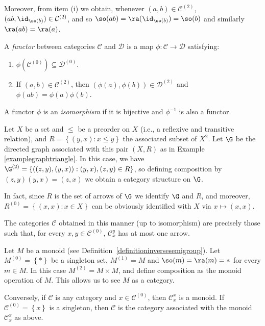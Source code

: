 Moreover, from item (i) we obtain, whenever $(a,b)\in\mathcal{C}^{(2)}$, $(ab,\id_{\so(b)})\in\mathcal{C}^{(2)}$, and so $\so(ab)=\ra(\id_{\so(b)})=\so(b)$ and similarly $\ra(ab)=\ra(a)$.

\begin{definition}
A \emph{functor} between categories $\mathcal{C}$ and $\mathcal{D}$ is a map $\phi:\mathcal{C}\to\mathcal{D}$ satisfying:
\begin{enumerate}
\item[(i)] $\phi(\mathcal{C}^{(0)})\subseteq\mathcal{D}^{(0)}$.
\item[(ii)] If $(a,b)\in\mathcal{C}^{(2)}$, then $(\phi(a),\phi(b))\in\mathcal{D}^{(2)}$ and $\phi(ab)=\phi(a)\phi(b)$.
\end{enumerate}
A functor $\phi$ is an \emph{isomorphism} if it is bijective and $\phi^{-1}$ is also a functor.
\end{definition}

\begin{example}\label{examplepreordersarecategories}
Let $X$ be a set and $\leq$ be a preorder on $X$ (i.e., a reflexive and transitive relation), and $R=\left\{(y,x):x\leq y\right\}$ the associated subset of $X^2$. Let $\G$ be the directed graph associated with this pair $(X,R)$ as in Example \ref{examplegraphtriangle}. In this case, we have $\G^{(2)}=\left\{((z,y),(y,x)):(y,x),(z,y)\in R\right\}$, so defining composition by $(z,y)(y,x)=(z,x)$ we obtain a category structure on $\G$.

In fact, since $R$ is the set of arrows of $\G$ we identify $\G$ and $R$, and moreover, $R^{(0)}=\left\{(x,x):x\in X\right\}$ can be obviously identified with $X$ via $x\mapsto (x,x)$.

The categories $\mathcal{C}$ obtained in this manner (up to isomorphism) are precisely those such that, for every $x,y\in\mathcal{C}^{(0)}$, $\mathcal{C}_x^y$ has at most one arrow.
\end{example}

\begin{example}\label{examplemonoidsarecategories}
Let $M$ be a monoid (see Definition~\ref{definitioninversesemigroup}). Let $M^{(0)}=\left\{\ast\right\}$ be a singleton set, $M^{(1)}=M$ and $\so(m)=\ra(m)=\ast$ for every $m\in M$. In this case $M^{(2)}=M\times M$, and define composition as the monoid operation of $M$. This allows us to see $M$ as a category.

Conversely, if $\mathcal{C}$ is any category and $x\in\mathcal{C}^{(0)}$, then $\mathcal{C}_x^x$ is a monoid. If $\mathcal{C}^{(0)}=\left\{x\right\}$ is a singleton, then $\mathcal{C}$ is the category associated with the monoid $\mathcal{C}_x^x$ as above.
\end{example}

